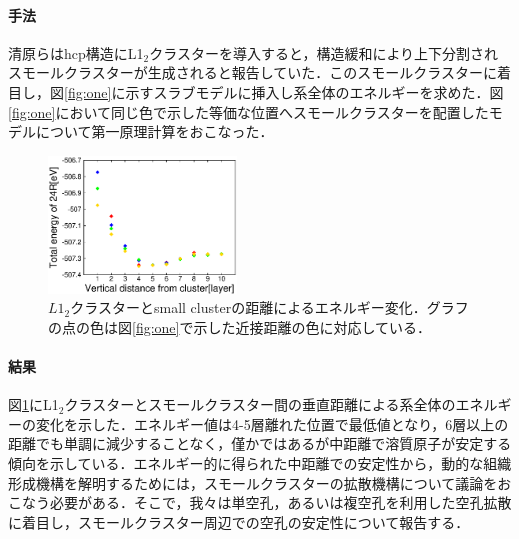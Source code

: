 \documentclass[12pt,a4paper,dvipdfmx]{jsarticle}
\begin{document}
\paragraph{手法}
清原らはhcp構造にL1$_2$クラスターを導入すると，構造緩和により上下分割されスモールクラスターが生成されると報告していた\cite{kiyohara}．このスモールクラスターに着目し，図\ref{fig:one}に示すスラブモデルに挿入し系全体のエネルギーを求めた．図\ref{fig:one}において同じ色で示した等価な位置へスモールクラスターを配置したモデルについて第一原理計算をおこなった．

\begin{figure}
\vspace{2\baselineskip}
\begin{center}
   \includegraphics[width=50mm]{smallcluster_Alld_JPS2017.eps}
  \caption{$L1_2$クラスターとsmall clusterの距離によるエネルギー変化．グラフの点の色は図\ref{fig:one}で示した近接距離の色に対応している．}
  \label{fig:two}
\end{center}
\vspace{-1\baselineskip}
\end{figure}
\vspace{-1\baselineskip}


\paragraph{結果}
図\ref{fig:two}にL1$_2$クラスターとスモールクラスター間の垂直距離による系全体のエネルギーの変化を示した．エネルギー値は4-5層離れた位置で最低値となり，6層以上の距離でも単調に減少することなく，僅かではあるが中距離で溶質原子が安定する傾向を示している．エネルギー的に得られた中距離での安定性から，動的な組織形成機構を解明するためには，スモールクラスターの拡散機構について議論をおこなう必要がある．そこで，我々は単空孔，あるいは複空孔を利用した空孔拡散に着目し，スモールクラスター周辺での空孔の安定性について報告する．
\vspace{-0.5\baselineskip}
\end{document}
